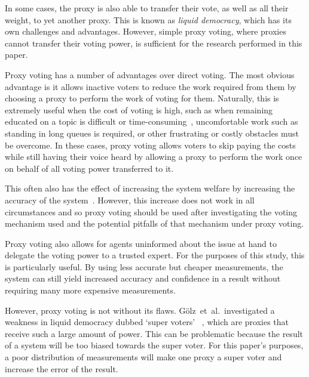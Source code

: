 In some cases, the proxy is also able to transfer their vote, as well as all
their weight, to yet another proxy.
This is known as \textit{liquid democracy}, which has its own challenges and
advantages.
However, simple proxy voting, where proxies cannot transfer their voting power,
is sufficient for the research performed in this paper.

Proxy voting has a number of advantages over direct voting.
The most obvious advantage is it allows inactive voters to reduce the work
required from them by choosing a proxy to perform the work of voting for them.
Naturally, this is extremely useful when the cost of voting is high, such as
when remaining educated on a topic is difficult or
time-consuming~\cite[para 1.1]{Mueller1972}, uncomfortable work such as standing
in long queues is required, or other frustrating or costly obstacles must be
overcome.
In these cases, proxy voting allows voters to skip paying the costs while still
having their voice heard by allowing a proxy to perform the work once on behalf
of all voting power transferred to it.

This often also has the effect of increasing the system welfare by
increasing the accuracy of the system~\cite[sec. 1.1]{Cohensius2017}.
However, this increase does not work in all circumstances and so proxy voting
should be used after investigating the voting mechanism used and the potential
pitfalls of that mechanism under proxy voting.

Proxy voting also allows for agents uninformed about the issue at hand to
delegate the voting power to a trusted expert.
For the purposes of this study, this is particularly useful.
By using less accurate but cheaper measurements, the system can still yield
increased accuracy and confidence in a result without requiring many more
expensive measurements.

However, proxy voting is not without its flaws.
Gölz~et~al.\ investigated a weakness in liquid democracy dubbed `super voters'
~\cite[para. 1.3]{Golz2021}, which are proxies that receive such a large amount
of power.
This can be problematic because the result of a system will be too biased
towards the super voter.
For this paper's purposes, a poor distribution of measurements will make one
proxy a super voter and increase the error of the result.



